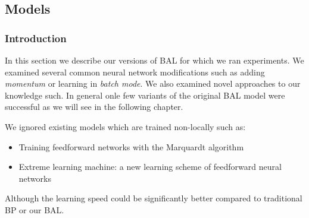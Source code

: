 \subsection{Models}

\subsubsection*{Introduction} 
In this section we describe our versions of BAL for which we ran experiments. We examined several common neural network modifications such as adding \emph{momentum} or learning in \emph{batch mode}. We also examined novel approaches to our knowledge such. In general onle few variants of the original BAL model were successful as we will see in the following chapter. 

We ignored existing models which are trained non-locally such as: 
\begin{itemize} 
\item Training feedforward networks with the Marquardt algorithm
\item Extreme learning machine: a new learning scheme of feedforward neural networks
\end{itemize} 
Although the learning speed could be significantly better compared to traditional BP or our BAL. 

 



 
  
 

 

